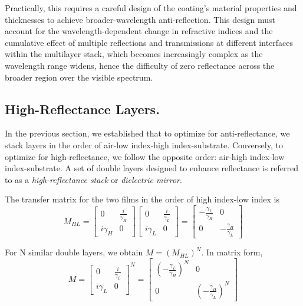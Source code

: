 Practically, this requires a careful design of the coating's material properties and thicknesses to achieve broader-wavelength anti-reflection. This design must account for the wavelength-dependent change in refractive indices and the cumulative effect of multiple reflections and transmissions at different interfaces within the multilayer stack, which becomes increasingly complex as the wavelength range widens, hence the difficulty of zero reflectance across the broader region over the visible spectrum.

\subsection{High-Reflectance Layers.}
In the previous section, we established that to optimize for anti-reflectance, we stack layers in the order of air-low index-high index-substrate. Conversely, to optimize for high-reflectance, we follow the opposite order: air-high index-low index-substrate. A set of double layers designed to enhance reflectance is referred to as a \emph{high-reflectance stack} or \emph{dielectric mirror}.

The transfer matrix for the two films in the order of high index-low index is
    \[
      M_{HL} = 
            \begin{bmatrix}
            0 & \frac{i}{\gamma_H} \\
            i\gamma_H & 0
            \end{bmatrix}
            \begin{bmatrix}
            0 & \frac{i}{\gamma_L} \\
            i\gamma_L & 0
            \end{bmatrix} =
                    \begin{bmatrix}
                        -\frac{\gamma_L}{\gamma_H} & 0  \\
                        0 & -\frac{\gamma_H}{\gamma_L}
                    \end{bmatrix}
    \]
    
For N similar double layers, we obtain $M = (M_{HL})^N$. In matrix form,
    \[
      M = 
            \begin{bmatrix}
            0 & \frac{i}{\gamma_L} \\
            i\gamma_L & 0
            \end{bmatrix}^N =
                \begin{bmatrix}
                    \left(-\frac{\gamma_L}{\gamma_H}\right)^N & 0  \\
                    0 & \left(-\frac{\gamma_H}{\gamma_L}\right)^N
                \end{bmatrix}
    \]

